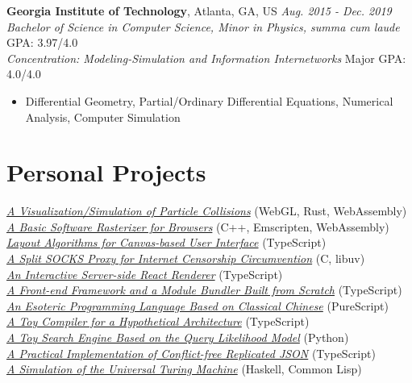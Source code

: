 \documentclass[12pt]{article}
\begin{document}
\textbf{Georgia Institute of Technology}, Atlanta, GA, US \hfill \textit{Aug. 2015 - Dec. 2019}\\
\textit{Bachelor of Science in Computer Science, Minor in Physics, \textit{summa cum laude}} \hfill GPA: 3.97/4.0\\
\textit{Concentration: Modeling-Simulation and Information Internetworks} \hfill Major GPA: 4.0/4.0
\begin{itemize}
\small
\item Differential Geometry, Partial/Ordinary Differential Equations, Numerical Analysis, Computer Simulation
\end{itemize}

\section*{Personal Projects}
\href{https://github.com/galmungral/particle-simulation}{\textit{A Visualization/Simulation of Particle Collisions}} \hfill (WebGL, Rust, WebAssembly) \\
\href{https://github.com/galmungral/rasterizer}{\textit{A Basic Software Rasterizer for Browsers}} \hfill (C++, Emscripten, WebAssembly) \\
\href{https://github.com/galmungral/michelangelo}{\textit{Layout Algorithms for Canvas-based User Interface}} \hfill (TypeScript) \\
\href{https://github.com/galmungral/telescope}{\textit{A Split SOCKS Proxy for Internet Censorship Circumvention}} \hfill (C, libuv) \\
\href{https://github.com/galmungral/react-teletype}{\textit{An Interactive Server-side React Renderer}} \hfill (TypeScript) \\
\href{https://github.com/galmungral/replay}{\textit{A Front-end Framework and a Module Bundler Built from Scratch}} \hfill (TypeScript) \\
\href{https://github.com/galmungral/hanbun-lang}{\textit{An Esoteric Programming Language Based on Classical Chinese}} \hfill (PureScript) \\
\href{https://github.com/galmungral/sketchpad}{\textit{A Toy Compiler for a Hypothetical Architecture}} \hfill (TypeScript) \\
\href{https://github.com/galmungral/plato}{\textit{A Toy Search Engine Based on the Query Likelihood Model}} \hfill (Python) \\
\href{https://github.com/galmungral/json-crdt}{\textit{A Practical Implementation of Conflict-free Replicated JSON}} \hfill (TypeScript) \\
\href{https://github.com/galmungral/turing-machine}{\textit{A Simulation of the Universal Turing Machine}} \hfill (Haskell, Common Lisp)
\end{document}
